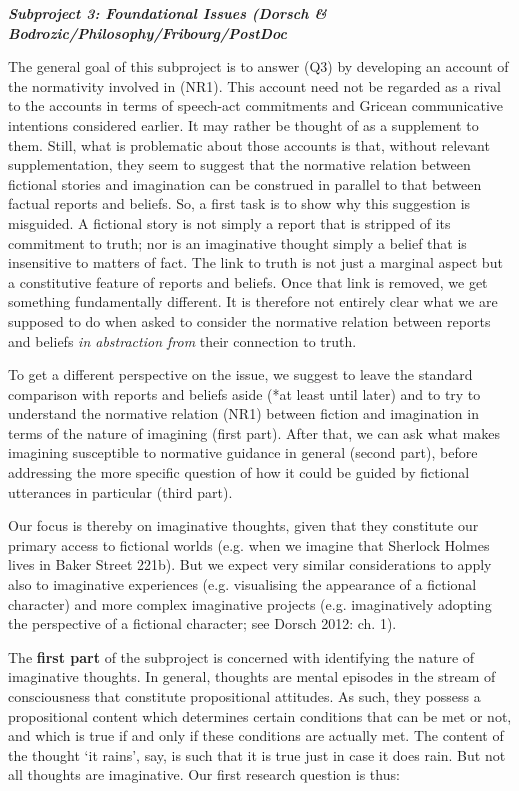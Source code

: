 \vspace{.2cm}
\noindent\textbf{\emph{Subproject 3: Foundational Issues (Dorsch \& Bodrozic/Philosophy/Fribourg/PostDoc}}
\vspace{.1cm}

\noindent The general goal of this subproject is to answer (Q3) by developing an account of the normativity involved in (NR1). This account need not be regarded as a rival to the accounts in terms of speech-act commitments and Gricean communicative intentions considered earlier. It may rather be thought of as a supplement to them. Still, what is problematic about those accounts is that, without relevant supplementation, they seem to suggest that the normative relation between fictional stories and imagination can be construed in parallel to that between factual reports and beliefs. So, a first task is to show why this suggestion is misguided. A fictional story is not simply a report that is stripped of its commitment to truth; nor is an imaginative thought simply a belief that is insensitive to matters of fact. The link to truth is not just a marginal aspect but a constitutive feature of reports and beliefs. Once that link is removed, we get something fundamentally different. It is therefore not entirely clear what we are supposed to do when asked to consider the normative relation between reports and beliefs \emph{in abstraction from} their connection to truth.

To get a different perspective on the issue, we suggest to leave the standard comparison with reports and beliefs aside (*at least until later) and to try to understand the normative relation (NR1) between fiction and imagination in terms of the nature of imagining (first part). After that, we can ask what makes imagining susceptible to normative guidance in general (second part), before addressing the more specific question of how it could be guided by fictional utterances in particular (third part).

Our focus is thereby on imaginative thoughts, given that they constitute our primary access to fictional worlds (e.g. when we imagine that Sherlock Holmes lives in Baker Street 221b). But we expect very similar considerations to apply also to imaginative experiences (e.g. visualising the appearance of a fictional character) and more complex imaginative projects (e.g. imaginatively adopting the perspective of a fictional character; see Dorsch 2012: ch. 1).

The \textbf{first part} of the subproject is concerned with identifying the nature of imaginative thoughts. In general, thoughts are mental episodes in the stream of consciousness that constitute propositional attitudes. As such, they possess a propositional content which determines certain conditions that can be met or not, and which is true if and only if these conditions are actually met. The content of the thought `it rains', say, is such that it is true just in case it does rain. But not all thoughts are imaginative. Our first research question is thus:


